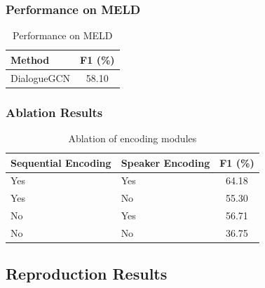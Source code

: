 \documentclass[a4paper,11pt]{article}
\begin{document}
\subsubsection{Performance on MELD}
\begin{table}[htbp]
  \centering
  \begin{tabular}{lc}
    \toprule
    Method & F1 (\%) \\
    \midrule
    DialogueGCN & 58.10 \\
    \bottomrule
  \end{tabular}
  \caption{Performance on MELD \cite{ghosal2019dialoguegcn}}
  \label{tab:orig_meld}
\end{table}

\subsubsection{Ablation Results}
\begin{table}[htbp]
  \centering
  \begin{tabular}{llc}
    \toprule
    Sequential Encoding & Speaker Encoding & F1 (\%) \\
    \midrule
    Yes & Yes & 64.18 \\
    Yes & No  & 55.30 \\
    No  & Yes & 56.71 \\
    No  & No  & 36.75 \\
    \bottomrule
  \end{tabular}
  \caption{Ablation of encoding modules \cite{ghosal2019dialoguegcn}}
  \label{tab:orig_ablate_enc}
\end{table}

\subsection{Reproduction Results}
\end{document}
